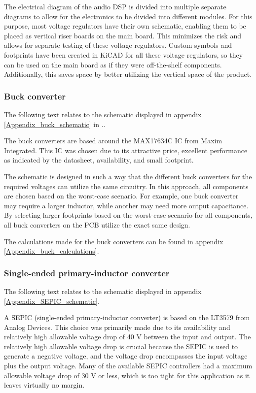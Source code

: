 The electrical diagram of the audio DSP is divided into multiple separate diagrams to allow for the electronics to be divided into different modules. For this purpose, most voltage regulators have their own schematic, enabling them to be placed as vertical riser boards on the main board. This minimizes the risk and allows for separate testing of these voltage regulators. Custom symbols and footprints have been created in KiCAD for all these voltage regulators, so they can be used on the main board as if they were off-the-shelf components. Additionally, this saves space by better utilizing the vertical space of the product.

\subsubsection{Buck converter}
The following text relates to the schematic displayed in appendix \ref{Appendix_buck_schematic} in ..

The buck converters are based around the MAX17634C IC from Maxim Integrated. This IC was chosen due to its attractive price, excellent performance as indicated by the datasheet, availability, and small footprint.

The schematic is designed in such a way that the different buck converters for the required voltages can utilize the same circuitry. In this approach, all components are chosen based on the worst-case scenario. For example, one buck converter may require a larger inductor, while another may need more output capacitance. By selecting larger footprints based on the worst-case scenario for all components, all buck converters on the PCB utilize the exact same design.

The calculations made for the buck converters can be found in appendix \ref{Appendix_buck_calculations}.

\subsubsection{Single-ended primary-inductor converter}
The following text relates to the schematic displayed in appendix \ref{Appendix_SEPIC_schematic}.

A SEPIC (single-ended primary-inductor converter) is based on the LT3579 from Analog Devices. This choice was primarily made due to its availability and relatively high allowable voltage drop of 40 V between the input and output. The relatively high allowable voltage drop is crucial because the SEPIC is used to generate a negative voltage, and the voltage drop encompasses the input voltage plus the output voltage. Many of the available SEPIC controllers had a maximum allowable voltage drop of 30 V or less, which is too tight for this application as it leaves virtually no margin.


